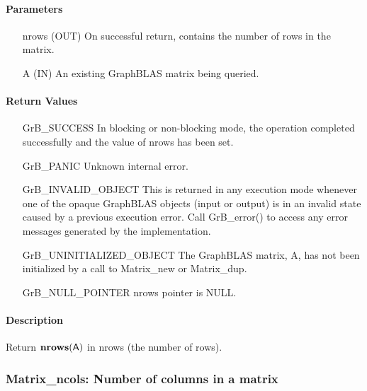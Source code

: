\paragraph{Parameters}

\begin{itemize}[leftmargin=1.1in]
    \item[{\sf nrows}] ({\sf OUT}) On successful return, contains the number of rows in the matrix.
    \item[{\sf A}] ({\sf IN}) An existing GraphBLAS matrix being queried.
\end{itemize}


\paragraph{Return Values}

\begin{itemize}[leftmargin=2.1in]
    \item[{\sf GrB\_SUCCESS}]   In blocking or non-blocking mode, the operation 
    completed successfully and the value of {\sf nrows} has been set.

    \item[{\sf GrB\_PANIC}]     Unknown internal error.
    
    \item[{\sf GrB\_INVALID\_OBJECT}] This is returned in any execution mode 
    whenever one of the opaque GraphBLAS objects (input or output) is in an invalid 
    state caused by a previous execution error.  Call {\sf GrB\_error()} to access 
    any error messages generated by the implementation.

    \item[{\sf GrB\_UNINITIALIZED\_OBJECT}]  The GraphBLAS matrix, {\sf A}, has 
    not been initialized by a call to {\sf Matrix\_new} or {\sf Matrix\_dup}.
    
    \item[{\sf GrB\_NULL\_POINTER}]  {\sf nrows} pointer is {\sf NULL}.
\end{itemize}

\paragraph{Description}

Return $\mathbf{nrows}({\sf A})$ in {\sf nrows} (the number of rows).

\subsubsection{{\sf Matrix\_ncols}: Number of columns in a matrix}

